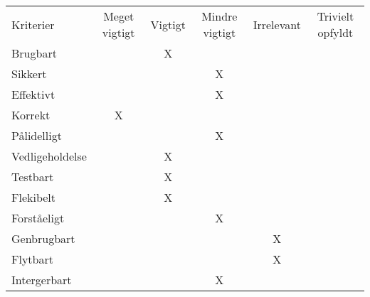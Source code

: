 \begin{table}[h]
\begin{tabular}{lccccc}
Kriterier       & Meget vigtigt & Vigtigt & Mindre vigtigt & Irrelevant & Trivielt opfyldt \\
Brugbart        &               & X       &                &            &                  \\
Sikkert         &               &         & X              &            &                  \\
Effektivt       &               &         & X              &            &                  \\
Korrekt         & X             &         &                &            &                  \\
Pålidelligt     &               &         & X              &            &                  \\
Vedligeholdelse &               & X       &                &            &                  \\
Testbart        &               & X       &                &            &                  \\
Flekibelt       &               & X       &                &            &                  \\
Forståeligt     &               &         & X              &            &                  \\
Genbrugbart     &               &         &                & X          &                  \\
Flytbart        &               &         &                & X          &                  \\
Intergerbart    &               &         & X              &            &                 
\end{tabular}
\end{table}